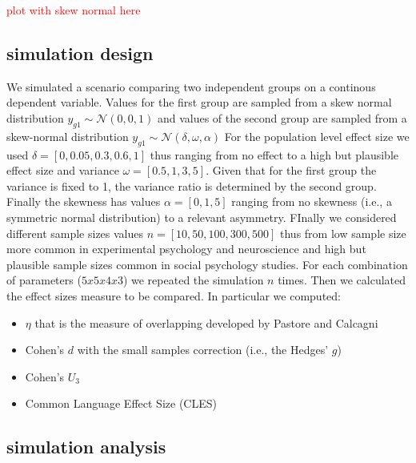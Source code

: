 \documentclass[man]{apa7}
\newcommand{\comment}[1]{
    \begin{center}
        \textcolor{red}{#1}
    \end{center}
}
\begin{document}

\comment{plot with skew normal here}

\subsection{simulation design}

We simulated a scenario comparing two independent groups on a continous dependent variable. Values for the first group are sampled from a skew normal distribution $y_{g1} \sim \mathcal{N} (0, 0, 1)$ and values of the second group are sampled from a skew-normal distribution $y_{g1} \sim \mathcal{N} (\delta,\omega, \alpha)$ %
For the population level effect size we used $\delta = [0, 0.05, 0.3, 0.6, 1]$ thus ranging from no effect to a high but plausible effect size and variance $\omega = [0.5, 1, 3, 5]$. Given that for the first group the variance is fixed to 1, the variance ratio is determined by the second group. Finally the skewness has values $\alpha = [0, 1, 5]$ ranging from no skewness (i.e., a symmetric normal distribution) to a relevant asymmetry. FInally we considered different sample sizes values $n = [10, 50, 100, 300, 500]$ thus from low sample size more common in experimental psychology and neuroscience and high but plausible sample sizes common in social psychology studies. %
For each combination of parameters ($5 x 5 x 4 x 3$) we repeated the simulation $n$ times. Then we calculated the effect sizes measure to be compared. In particular we computed:

\begin{itemize}
    \item $\eta$ that is the measure of overlapping developed by Pastore and Calcagni \cite{Pastore2019-tq}
    \item Cohen's $d$ with the small samples correction (i.e., the Hedges' $g$) \cite{Hedges1981-za}
    \item Cohen's $U_3$
    \item Common Language Effect Size (CLES)
\end{itemize}

\subsection{simulation analysis}
\end{document}
